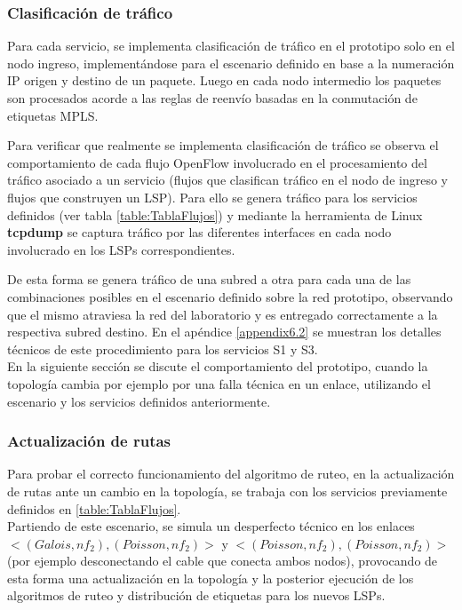 \subsubsection{Clasificaci\'on de tr\'afico}
Para cada servicio, se implementa clasificaci\'on de tr\'afico en el prototipo solo en el nodo ingreso, implementándose para el escenario definido en base a la numeraci\'on IP origen y destino de un paquete. Luego en cada nodo intermedio los paquetes son procesados acorde a las reglas de reenvío basadas en la conmutación de etiquetas MPLS.

Para verificar que realmente se implementa clasificaci\'on de tr\'afico se observa el comportamiento de cada flujo OpenFlow involucrado en el procesamiento del tr\'afico asociado a un servicio (flujos que clasifican tr\'afico en el nodo de ingreso y flujos que construyen un LSP). Para ello se genera tr\'afico para los servicios definidos (ver tabla \ref{table:TablaFlujos}) y mediante la herramienta de Linux \textbf{tcpdump} se captura tr\'afico por las diferentes interfaces en cada nodo involucrado en los LSPs correspondientes. 

De esta forma se genera tr\'afico de una subred a otra para cada una de las combinaciones posibles en el escenario definido sobre la red prototipo, observando que el mismo atraviesa la red del laboratorio y es entregado correctamente a la respectiva subred destino. En el ap\'endice \ref{appendix6.2} se muestran los detalles t\'ecnicos de este procedimiento para los servicios S1 y S3.\\

En la siguiente secci\'on se discute el comportamiento del prototipo, cuando la topolog\'ia cambia por ejemplo por una falla t\'ecnica en un enlace, utilizando el escenario y los servicios definidos anteriormente.

\subsubsection{Actualizaci\'on de rutas}
Para probar el correcto funcionamiento del algoritmo de ruteo, en la actualizaci\'on de rutas ante un cambio en la topolog\'ia, se trabaja con los servicios previamente definidos en \ref{table:TablaFlujos}.\\ 

Partiendo de este escenario, se simula un desperfecto t\'ecnico en los enlaces \\ $<(Galois, nf_2), (Poisson, nf_2)>$ y  $<(Poisson, nf_2), (Poisson, nf_2)>$ (por ejemplo desconectando el cable que conecta ambos nodos), provocando de esta forma una actualizaci\'on en la topolog\'ia y la posterior ejecuci\'on de los algoritmos de ruteo y distribución de etiquetas para los nuevos LSPs.\\ 
 
